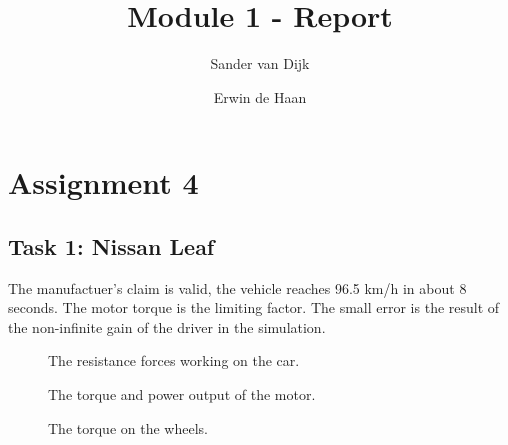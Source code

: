 \documentclass[final]{scrreprt} %
\title{Module 1 - Report}
\author{Sander {van Dijk} \and Erwin {de Haan}}
\begin{document}
\chapter{Assignment 4}
\section{Task 1: Nissan Leaf}
The manufactuer's claim is valid, the vehicle reaches 96.5 km/h in about 8 seconds.
The motor torque is the limiting factor.
The small error is the result of the non-infinite gain of the driver in the simulation.
\begin{figure}[H]
	\centering
    	\setlength\figureheight{4cm}
    	\setlength{}
    	
    	\label{fig:resistance-forces}
    	\caption{The resistance forces working on the car.}
\end{figure}
\begin{figure}[H]
	\centering
    	\setlength\figureheight{4cm}
    	\setlength{}
    	
    	\label{fig:motor-torque-power}
    	\caption{The torque and power output of the motor.}
\end{figure}
\begin{figure}[H]
	\centering
    	\setlength\figureheight{4cm}
    	\setlength{}
    	
    	\label{fig:wheel-torque}
    	\caption{The torque on the wheels.}
\end{figure}
\end{document}
